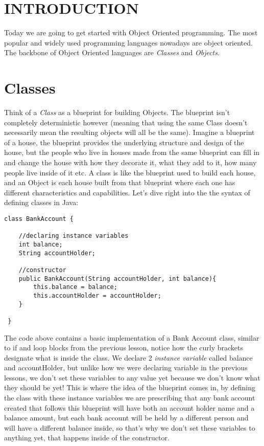 \documentclass[14pt]{extreport}%
\begin{document}
\section*{INTRODUCTION}     
Today we are going to get started with Object Oriented programming. The most popular and widely used programming languages nowadays are object oriented. The backbone of Object Oriented languages are \textit{Classes} and \textit{Objects}. 

\section*{Classes}
Think of a \textit{Class} as a blueprint for building Objects. The blueprint isn't completely deterministic however (meaning that using the same Class doesn't necessarily mean the resulting objects will all be the same). Imagine a blueprint of a house, the blueprint provides the underlying structure and design of the house, but the people who live in houses made from the same blueprint can fill in and change the house with how they decorate it, what they add to it, how many people live inside of it etc. A class is like the blueprint used to build each house, and an Object is each house built from that blueprint where each one has different characteristics and capabilities. Let's dive right into the the syntax of defining classes in Java:

\begin{lstlisting}
class BankAccount {
     
    //declaring instance variables 
    int balance;
    String accountHolder;
    
    //constructor 
    public BankAccount(String accountHolder, int balance){
        this.balance = balance;
        this.accountHolder = accountHolder;
    }

 }
\end{lstlisting}{}
The code above contains a basic implementation of a Bank Account class, similar to if and loop blocks from the previous lesson, notice how the curly brackets designate what is inside the class. We declare 2 \textit{instance variable} called balance and accountHolder, but unlike how we were declaring variable in the previous lessons, we don't set these variables to any value yet because we don't know what they should be yet! This is where the idea of the blueprint comes in, by defining the class with these instance variables we are prescribing that any bank account created that follows this blueprint will have both an account holder name and a balance amount, but each bank account will be held by a different person and will have a different balance inside, so that's why we don't set these variables to anything yet, that happens inside of the constructor.
\end{document}
